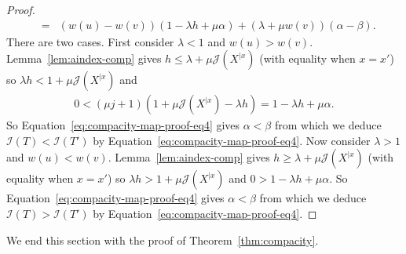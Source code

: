 \documentclass[11 pt]{modarticle}
\newcommand{\wmap}{w}
\newcommand{\rtree}[2]{{#1}^{\lvert #2}}
\newcommand{\indexsymbol}{\mathcal{I}}
\newcommand{\tindex}[1]{\indexsymbol(#1)}
\newcommand{\rindexsymbol}{\mathcal{J}}
\newcommand{\rindex}[2]{\rindexsymbol(\rtree{#2}{#1})}
\begin{document}
\begin{proof}
\begin{eqnarray}
	& = & (\wmap(u) - \wmap(v))(1 - \lambda h + \mu \alpha)  + (\lambda + \mu \wmap(v))(\alpha - \beta). \label{eq:compacity-map-proof-eq4}
\end{eqnarray}
There are two cases. First consider $\lambda < 1$ and $\wmap(u) > \wmap(v)$. Lemma~\ref{lem:aindex-comp} gives $h \leq \lambda + \mu \rindex{x}{X}$ (with equality when $x = x'$) so $\lambda h < 1 + \mu \rindex{x}{X}$ and
\begin{eqnarray*}
	0 < (\mu j + 1)(1 + \mu \rindex{x}{X} - \lambda h) =  1 - \lambda h + \mu \alpha.
\end{eqnarray*}
So Equation~\eqref{eq:compacity-map-proof-eq4} gives $\alpha < \beta$ from which we deduce $\tindex{T} < \tindex{T'}$ by Equation~\eqref{eq:compacity-map-proof-eq4}. Now consider $\lambda > 1$ and $\wmap(u) < \wmap(v)$. Lemma~\ref{lem:aindex-comp} gives $h \geq \lambda + \mu \rindex{x}{X}$  (with equality when $x = x'$) so $\lambda h > 1 + \mu \rindex{x}{X}$ and $0 > 1 - \lambda h + \mu \alpha$. So Equation~\eqref{eq:compacity-map-proof-eq4} gives $\alpha < \beta$ from which we deduce $\tindex{T} > \tindex{T'}$ by Equation~\eqref{eq:compacity-map-proof-eq4}.
\end{proof}

We end this section with the proof of Theorem~\ref{thm:compacity}.
\end{document}
